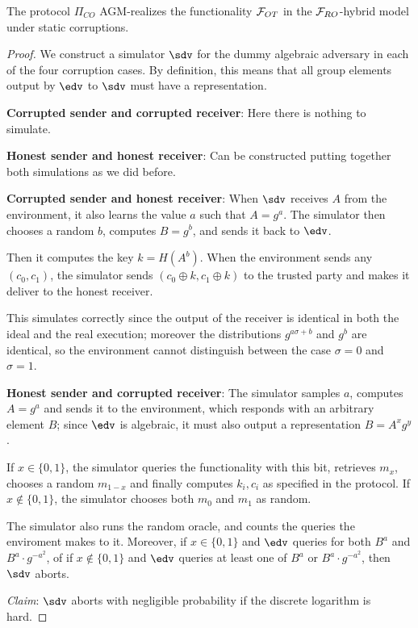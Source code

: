 \begin{theorem}
    The protocol $\Pi_{CO}$ AGM-realizes the functionality $\mathcal{F}_{OT}$ in the $\mathcal{F}_{RO}$-hybrid model under static corruptions.
\end{theorem}
\begin{proof}
    We construct a simulator $\sdv$ for the dummy algebraic adversary in each of the four corruption cases. By definition, this means that all group elements output by $\edv$ to $\sdv$ must have a representation.

    \textbf{Corrupted sender and corrupted receiver}: Here there is nothing to simulate.

    \textbf{Honest sender and honest receiver}: Can be constructed putting together both simulations as we did before.

    \textbf{Corrupted sender and honest receiver}: When $\sdv$ receives $A$ from the environment, it also learns the value $a$ such that $A=g^a$.
    The simulator then chooses a random $b$, computes $B=g^b$, and sends it back to $\edv$.

    Then it computes the key $k=H(A^b)$. When the environment sends any $(c_0,c_1)$, the simulator sends $(c_0\oplus k, c_1\oplus k)$ to the trusted party and makes it deliver to the honest receiver.

    This simulates correctly since the output of the receiver is identical in both the ideal and the real execution; moreover the distributions $g^{a\sigma+b}$ and $g^b$ are identical, so the environment cannot distinguish between the case $\sigma=0$ and $\sigma=1$.

    \textbf{Honest sender and corrupted receiver}: The simulator samples $a$, computes $A=g^a$ and sends it to the environment, which responds with an arbitrary element $B$; since $\edv$ is algebraic, it must also output a representation $B=A^x g^y$.

    If $x\in\{0,1\}$, the simulator queries the functionality with this bit, retrieves $m_x$, chooses a random $m_{1-x}$ and finally computes $k_i,c_i$ as specified in the protocol. If $x\not\in\{0,1\}$, the simulator chooses both $m_0$ and $m_1$ as random.

    The simulator also runs the random oracle, and counts the queries the enviroment makes to it. Moreover, if $x\in\{0,1\}$ and $\edv$ queries for both $B^a$ and $B^a\cdot g^{-a^2}$, of if $x\not\in\{0,1\}$ and $\edv$ queries at least one of $B^a$ or $B^a\cdot g^{-a^2}$, then $\sdv$ aborts.

    \textit{Claim}: $\sdv$ aborts with negligible probability if the discrete logarithm is hard.


\end{proof}
